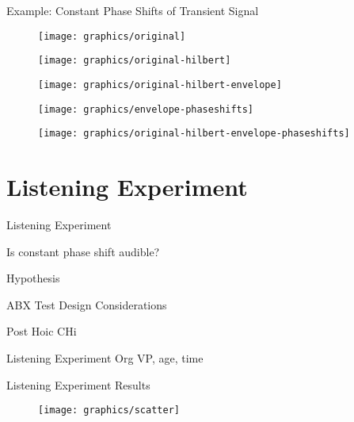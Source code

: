 \documentclass[mathserif]{intbeamer}
\begin{document}
\begin{frame}{Example: Constant Phase Shifts of Transient Signal}
{
\begin{figure}
\texttt{[image: graphics/original]}
\end{figure}
}
{
\begin{figure}
\texttt{[image: graphics/original-hilbert]}
\end{figure}
}
{
\begin{figure}
\texttt{[image: graphics/original-hilbert-envelope]}
\end{figure}
}
{
\begin{figure}
\texttt{[image: graphics/envelope-phaseshifts]}
\end{figure}
}
{
\begin{figure}
\texttt{[image: graphics/original-hilbert-envelope-phaseshifts]}
\end{figure}
}
\end{frame}

%
%
%

%
%
%

%
%
%

%
%
%
%
%
%
\section{Listening Experiment}
\begin{frame}{Listening Experiment}

Is constant phase shift audible?


Hypothesis

ABX Test Design Considerations

Post Hoic CHi

\end{frame}
%
%
%
\begin{frame}{Listening Experiment Org}
VP, age, time

\end{frame}
%
%
%
\begin{frame}{Listening Experiment Results}
\begin{figure}
\texttt{[image: graphics/scatter]}
\end{figure}
\end{frame}
%
%
%
\end{document}
